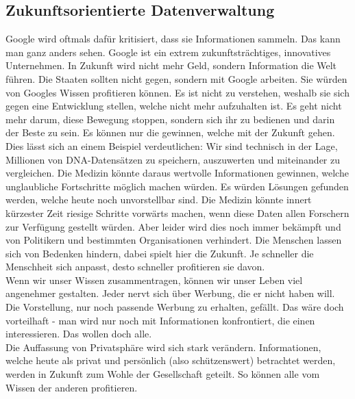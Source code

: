 \subsection{Zukunftsorientierte Datenverwaltung}
Google wird oftmals dafür kritisiert, dass sie Informationen sammeln. 
Das kann man ganz anders sehen. Google ist ein extrem zukunftsträchtiges, 
innovatives Unternehmen. In Zukunft wird nicht mehr Geld, sondern 
Information die Welt führen. Die Staaten sollten nicht gegen, sondern 
mit Google arbeiten. Sie würden von Googles Wissen profitieren können.
Es ist nicht zu verstehen, weshalb sie sich gegen eine Entwicklung stellen, welche 
nicht mehr aufzuhalten ist. Es geht nicht mehr darum, diese Bewegung 
stoppen, sondern sich ihr zu bedienen und darin der Beste zu sein. Es 
können nur die gewinnen, welche mit der Zukunft gehen.\\
Dies l\"asst sich an einem Beispiel verdeutlichen: Wir sind technisch in 
der Lage, Millionen von DNA-Datensätzen zu speichern, auszuwerten und 
miteinander zu vergleichen. Die Medizin könnte daraus wertvolle 
Informationen gewinnen, welche unglaubliche Fortschritte möglich machen 
würden. Es würden Lösungen gefunden werden, welche heute noch unvorstellbar 
sind. Die Medizin könnte innert kürzester Zeit riesige Schritte 
vorwärts machen, wenn diese Daten allen Forschern zur Verfügung gestellt 
würden. Aber leider wird dies noch immer bekämpft und von Politikern 
und bestimmten Organisationen verhindert. Die Menschen lassen sich von Bedenken 
hindern, dabei spielt hier die Zukunft. Je schneller die Menschheit sich anpasst, 
desto schneller profitieren sie davon.\\
Wenn wir unser Wissen zusammentragen, können wir unser Leben viel 
angenehmer gestalten. Jeder nervt sich über Werbung, die er nicht haben 
will. Die Vorstellung, nur noch passende 
Werbung zu erhalten, gef\"allt. Das wäre doch vorteilhaft - man wird nur noch mit 
Informationen konfrontiert, die einen interessieren. Das wollen doch 
alle.\\
Die Auffassung von Privatsphäre wird sich stark 
verändern. Informationen, welche heute als privat und persönlich 
(also schützenswert) betrachtet werden, werden in Zukunft zum Wohle der 
Gesellschaft geteilt. So können alle vom Wissen der anderen profitieren.

